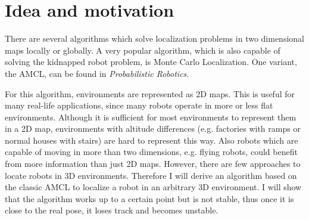\documentclass[Thesis.tex]{subfiles}
\begin{document}
\section{Idea and motivation}

There are several algorithms which solve localization problems in two dimensional maps locally or globally. A very popular algorithm, which is also capable of solving the kidnapped robot problem, is Monte Carlo Localization\cite{DellaertFoxBurgardThrun:1999}. One variant, the \gls{AMCL}, can be found in \emph{Probabilistic Robotics}\cite{ThrunBurgardFox:2005}.

For this algorithm, environments are represented as 2D maps. This is useful for many real-life applications, since many robots operate in more or less flat environments. Although it is sufficient for most environments to represent them in a 2D map, environments with altitude differences (e.g. factories with ramps or normal houses with stairs) are hard to represent this way. Also robots which are capable of moving in more than two dimensions, e.g. flying robots, could benefit from more information than just 2D maps.
However, there are few approaches to locate robots in 3D environments. Therefore I will derive an algorithm based on the classic \gls{AMCL} to localize a robot in an arbitrary 3D environment. I will show that the algorithm works up to a certain point but is not stable, thus once it is close to the real pose, it loses track and becomes unstable.
\end{document}
